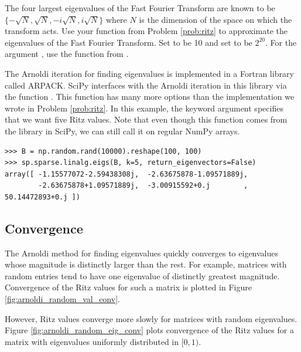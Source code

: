 \begin{problem}
\label{prob:fourier_eigs}
The four largest eigenvalues of the Fast Fourier Transform are known to be $\{ -\sqrt{N}, \sqrt{N}, -i\sqrt{N}, i\sqrt{N} \}$ where $N$ is the dimension of the space on which the transform acts.
Use your function  from Problem \ref{prob:ritz} to approximate the eigenvalues of the Fast Fourier Transform.
Set  to be 10 and set  to be $2^{20}$.
For the argument , use the  function from .
\end{problem}

The Arnoldi iteration for finding eigenvalues is implemented in a Fortran library called ARPACK.
SciPy interfaces with the Arnoldi iteration in this library via the function .
This function has many more options than the implementation we wrote in Problem \ref{prob:ritz}.
In this example, the keyword argument  specifies that we want five Ritz values.
Note that even though this function comes from the  library in SciPy, we can still call it on regular NumPy arrays.

\begin{lstlisting}
>>> B = np.random.rand(10000).reshape(100, 100)
>>> sp.sparse.linalg.eigs(B, k=5, return_eigenvectors=False)
array([ -1.15577072-2.59438308j,  -2.63675878-1.09571889j,
        -2.63675878+1.09571889j,  -3.00915592+0.j        ,  50.14472893+0.j ])
\end{lstlisting}

\subsection*{Convergence} %

The Arnoldi method for finding eigenvalues quickly converges to eigenvalues whose magnitude is distinctly larger than the rest.
For example, matrices with random entries tend to have one eigenvalue of distinctly greatest magnitude.
Convergence of the Ritz values for such a matrix is plotted in Figure \ref{fig:arnoldi_random_val_conv}.

However, Ritz values converge more slowly for matrices with random eigenvalues.
Figure \ref{fig:arnoldi_random_eig_conv} plots convergence of the Ritz values for a matrix with eigenvalues uniformly distributed in $[0,1)$.

